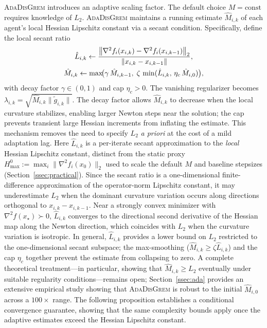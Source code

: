 \documentclass[review,onefignum,onetabnum]{siamart171218}
\begin{document}
	\textsc{AdaDisGrem} introduces an adaptive scaling factor.
	The default choice $M=\mathrm{const}$ requires knowledge of $L_2$.
	\textsc{AdaDisGrem} maintains a running estimate $\hat M_{i,k}$ of
	each agent's local Hessian Lipschitz constant via a secant condition.
	Specifically, define the local secant ratio
	\begin{gather*}
	\hat L_{i,k}\gets
	\frac{\left\|\nabla^2 f_i(x_{i,k})-\nabla^2 f_i(x_{i,k-1})\right\|_2}
	     {\left\|x_{i,k}-x_{i,k-1}\right\|},\\
	\hat M_{i,k}\gets \max\!\bigl(\gamma\,\hat M_{i,k-1},\;
	\zeta\,\min(\hat L_{i,k},\,\eta_c\,\hat M_{i,0})\bigr),
	\end{gather*}
	with decay factor $\gamma\in(0,1)$ and cap $\eta_c>0$.
	The vanishing regularizer becomes $\lambda_{i,k}=\sqrt{\hat M_{i,k}\|\tilde g_{i,k}\|}$.
	The decay factor allows $\hat M_{i,k}$ to decrease when the local
	curvature stabilizes, enabling larger Newton steps near the solution;
	the cap prevents transient large Hessian increments from inflating
	the estimate.
	This mechanism removes the need to specify $L_2$ \emph{a priori}
	at the cost of a mild adaptation lag.
	Here $\hat L_{i,k}$ is a per-iterate secant
	approximation to the \emph{local} Hessian Lipschitz constant,
	distinct from the static proxy
	$H_{\max}^0 := \max_i\|\nabla^2 f_i(x_0)\|_2$ used to
	scale the default $M$ and baseline stepsizes (Section~\ref{ssec:practical}).
	Since the secant ratio is a one-dimensional finite-difference
	approximation of the operator-norm Lipschitz constant, it may
	underestimate $L_2$ when the dominant curvature variation occurs
	along directions orthogonal to $x_{i,k}-x_{i,k-1}$.
	Near a strongly convex minimizer with $\nabla^2 f(x_\star)\succ 0$,
	$\hat L_{i,k}$ converges to the directional second
	derivative of the Hessian map along the Newton direction, which
	coincides with $L_2$ when the curvature variation is isotropic.
	In general, $\hat L_{i,k}$ provides a lower bound on $L_2$
	restricted to the one-dimensional secant subspace; the
	max-smoothing ($\hat M_{i,k}\ge\zeta\hat L_{i,k}$) and the cap
	$\eta_c$ together prevent the estimate from collapsing to zero.
	A complete theoretical treatment---in particular, showing that
	$\hat M_{i,k}\ge L_2$ eventually under suitable regularity
	conditions---remains open;
	Section~\ref{ssec:ada} provides an extensive empirical study
	showing that \textsc{AdaDisGrem} is robust to the initial
	$\hat M_{i,0}$ across a $100\times$ range.
	The following proposition establishes a conditional convergence
	guarantee, showing that the same complexity bounds apply once
	the adaptive estimates exceed the Hessian Lipschitz constant.
\end{document}
